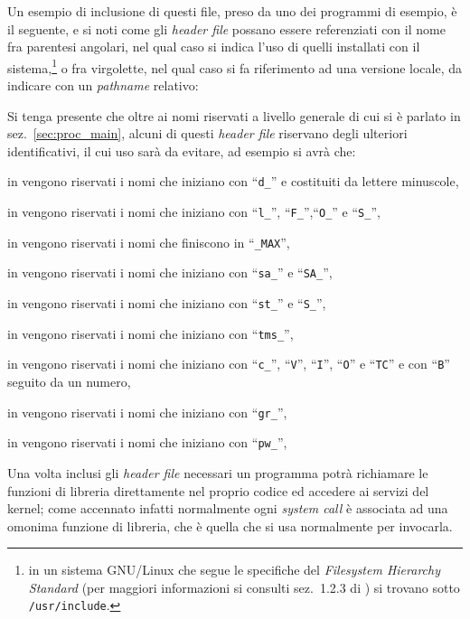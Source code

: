 Un esempio di inclusione di questi file, preso da uno dei programmi di
esempio, è il seguente, e si noti come gli \textit{header file} possano essere
referenziati con il nome fra parentesi angolari, nel qual caso si indica l'uso
di quelli installati con il sistema,\footnote{in un sistema GNU/Linux che
  segue le specifiche del \textit{Filesystem Hierarchy Standard} (per maggiori
  informazioni si consulti sez.~1.2.3 di \cite{AGL}) si trovano sotto
  \texttt{/usr/include}.}  o fra virgolette, nel qual caso si fa riferimento
ad una versione locale, da indicare con un \textit{pathname} relativo:

Si tenga presente che oltre ai nomi riservati a livello generale di cui si è
parlato in sez.~\ref{sec:proc_main}, alcuni di questi \textit{header file}
riservano degli ulteriori identificativi, il cui uso sarà da evitare, ad
esempio si avrà che:
\begin{itemize*}
\item in  vengono riservati i nomi che iniziano con
  ``\texttt{d\_}'' e costituiti da lettere minuscole,
\item in  vengono riservati i nomi che iniziano con
  ``\texttt{l\_}'', ``\texttt{F\_}'',``\texttt{O\_}'' e ``\texttt{S\_}'',
\item in  vengono riservati i nomi che finiscono in
  ``\texttt{\_MAX}'',
\item in  vengono riservati i nomi che iniziano con
  ``\texttt{sa\_}'' e ``\texttt{SA\_}'',
\item in  vengono riservati i nomi che iniziano con
  ``\texttt{st\_}'' e ``\texttt{S\_}'',
\item in  vengono riservati i nomi che iniziano con
  ``\texttt{tms\_}'',
\item in  vengono riservati i nomi che iniziano con
  ``\texttt{c\_}'', ``\texttt{V}'', ``\texttt{I}'', ``\texttt{O}'' e
  ``\texttt{TC}'' e con ``\texttt{B}'' seguito da un numero,
\item in  vengono riservati i nomi che iniziano con
  ``\texttt{gr\_}'',
\item in  vengono riservati i nomi che iniziano con
  ``\texttt{pw\_}'',
\end{itemize*}


Una volta inclusi gli \textit{header file} necessari un programma potrà
richiamare le funzioni di libreria direttamente nel proprio codice ed accedere
ai servizi del kernel; come accennato infatti normalmente ogni \textit{system
  call} è associata ad una omonima funzione di libreria, che è quella che si
usa normalmente per invocarla.


